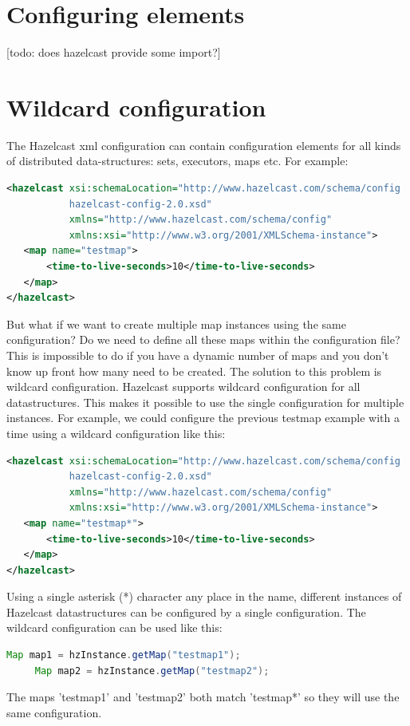 \section{Configuring elements}


[todo: does hazelcast provide some import?]

\section{Wildcard configuration}
The Hazelcast xml configuration can contain configuration elements for all kinds of distributed data-structures: sets, executors, maps etc. For example:
\begin{lstlisting}[language=xml]
<hazelcast xsi:schemaLocation="http://www.hazelcast.com/schema/config
           hazelcast-config-2.0.xsd"
           xmlns="http://www.hazelcast.com/schema/config"
           xmlns:xsi="http://www.w3.org/2001/XMLSchema-instance">
   <map name="testmap">
       <time-to-live-seconds>10</time-to-live-seconds>
   </map>
</hazelcast>
\end{lstlisting}
But what if we want to create multiple map instances using the same configuration? Do we need to define all these maps within the configuration file? This is impossible to do if you have a dynamic number of maps and you don't know up front how many need to be created. The solution to this problem is wildcard configuration. Hazelcast supports wildcard configuration for all datastructures. This makes it possible to use the single configuration for multiple instances. For example, we could configure the previous testmap example with a time using a wildcard configuration like this:
\begin{lstlisting}[language=xml]
<hazelcast xsi:schemaLocation="http://www.hazelcast.com/schema/config
           hazelcast-config-2.0.xsd"
           xmlns="http://www.hazelcast.com/schema/config"
           xmlns:xsi="http://www.w3.org/2001/XMLSchema-instance">
   <map name="testmap*">
       <time-to-live-seconds>10</time-to-live-seconds>
   </map>
</hazelcast>
\end{lstlisting}
Using a single asterisk (*) character any place in the name, different instances of Hazelcast datastructures can be configured by a single configuration. The wildcard configuration can be used like this:
\begin{lstlisting}[language=java]
     Map map1 = hzInstance.getMap("testmap1");
     Map map2 = hzInstance.getMap("testmap2");
\end{lstlisting}
The maps 'testmap1' and 'testmap2' both match 'testmap*' so they will use the same configuration.


